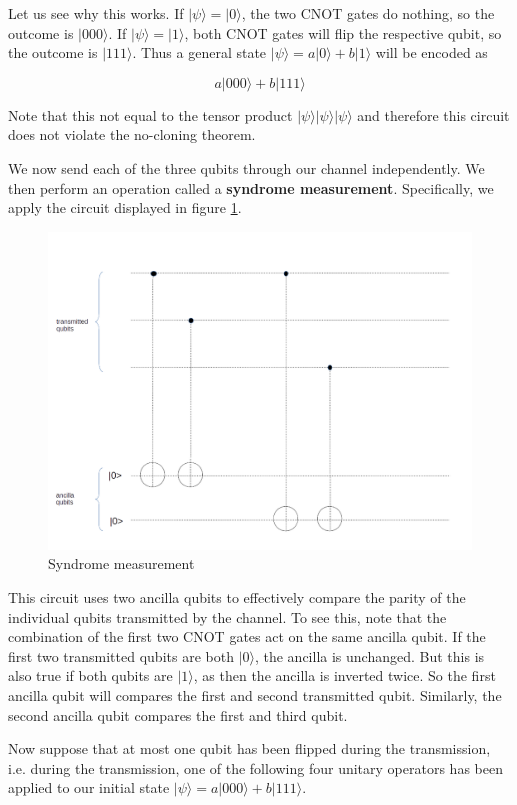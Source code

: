 \documentclass[a4paper, draft]{article}
\theoremstyle{own}
\theoremstyle{remark}
\begin{document}
Let us see why this works. If $|\psi \rangle = |0 \rangle$, the two CNOT gates do nothing, so the outcome is $|000 \rangle$. If $|\psi \rangle = |1\rangle$, both CNOT gates will flip the respective qubit, so the outcome is $|111\rangle$. Thus a general state $|\psi \rangle = a|0 \rangle + b|1\rangle$ will be encoded as

$$
a |000 \rangle + b |111 \rangle
$$

Note that this not equal to the tensor product $|\psi \rangle  |\psi \rangle |\psi \rangle$ and therefore this circuit does not violate the no-cloning theorem. 

We now send each of the three qubits through our channel independently. We then perform an operation called a {\bf syndrome measurement}. Specifically, we apply the circuit displayed in figure \ref{fig:SyndromeMeasurement}.

\begin{figure}[ht]
\centering
\includegraphics[width=0.7\linewidth]{images/SyndromeMeasurement}
\caption[Syndrome measurement]{Syndrome measurement}
\label{fig:SyndromeMeasurement}
\end{figure}

This circuit uses two ancilla qubits to effectively compare the parity of the individual qubits transmitted by the channel. To see this, note that the combination of the first two CNOT gates act on the same ancilla qubit. If the first two transmitted qubits are both $|0 \rangle$, the ancilla is unchanged. But this is also true if both qubits are $|1 \rangle$, as then the ancilla is inverted twice. So the first ancilla qubit will compares the first and second transmitted qubit. Similarly, the second ancilla qubit compares the first and third qubit.

Now suppose that at most one qubit has been flipped during the transmission, i.e. during the transmission, one of the following four unitary operators has been applied to our initial state $|\psi \rangle = a |000 \rangle + b |111 \rangle$. 
\end{document}
